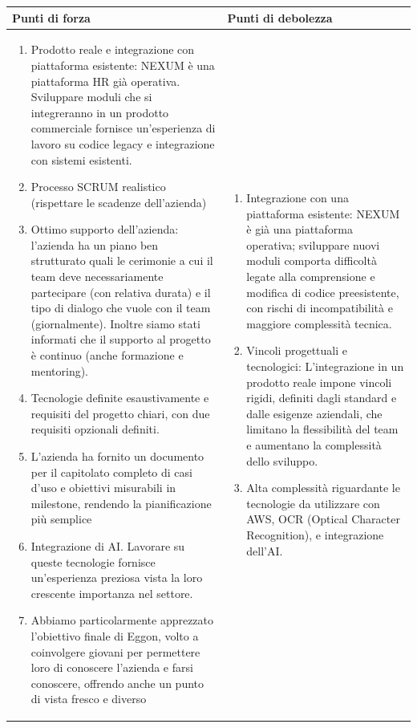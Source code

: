 \documentclass[a4paper,11pt]{article}
\begin{document}
{\footnotesize
\begin{tabularx}{\textwidth}{|X|X|}
\hline
\rowcolor{lightgray!40} %
\textbf{Punti di forza} & \textbf{Punti di debolezza} \\
\hline
\begin{enumerate}
\item Prodotto reale e integrazione con piattaforma esistente: NEXUM è una piattaforma HR già operativa. Sviluppare moduli che si integreranno in un prodotto commerciale fornisce un'esperienza di lavoro su codice legacy e integrazione con sistemi esistenti.
\item Processo SCRUM realistico (rispettare le scadenze dell'azienda)
\item Ottimo supporto dell'azienda: l'azienda ha un piano ben strutturato quali le cerimonie a cui il team deve necessariamente partecipare (con relativa durata) e il tipo di dialogo che vuole con il team (giornalmente). Inoltre siamo stati informati che il supporto al progetto è continuo (anche formazione e mentoring).
\item Tecnologie definite esaustivamente e  requisiti del progetto chiari, con due requisiti opzionali definiti.
\item L'azienda ha fornito un documento per il capitolato completo di casi d'uso e obiettivi misurabili in milestone, rendendo la pianificazione più semplice
\item Integrazione di AI. Lavorare su queste tecnologie fornisce un'esperienza preziosa vista la loro crescente importanza nel settore.
\item Abbiamo particolarmente apprezzato l'obiettivo finale di Eggon, volto a coinvolgere giovani per permettere loro di conoscere l'azienda e farsi conoscere, offrendo anche un punto di vista fresco e diverso
\end{enumerate}
& 
\begin{enumerate}
  \item Integrazione con una piattaforma esistente: NEXUM è già una piattaforma operativa; sviluppare nuovi moduli comporta difficoltà legate alla comprensione e modifica di codice preesistente, con rischi di incompatibilità e maggiore complessità tecnica.
    \item Vincoli progettuali e tecnologici: L'integrazione in un prodotto reale impone vincoli rigidi, definiti dagli standard e dalle esigenze aziendali, che limitano la flessibilità del team e aumentano la complessità dello sviluppo.
\item Alta complessità riguardante le tecnologie da utilizzare con AWS, OCR (Optical Character Recognition), e integrazione dell'AI.
\end{enumerate} \\
\hline
\end{tabularx}
}
\end{document}
